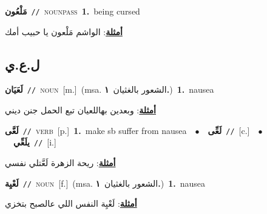 \documentclass[10pt,a4paper,twoside]{article} %
\begin{document}
\begin{multicols}{2}
{\setlength\topsep{0pt}\textbf{\foreignlanguage{arabic}{مَلْعُون}}\ {\color{gray}\texttt{//}\color{black}}\ \textsc{noun\textunderscore pass}\ \textbf{1.}~being cursed\  \begin{flushright}\color{gray}\foreignlanguage{arabic}{\textbf{\underline{\foreignlanguage{arabic}{أمثلة}}}: الواشم مَلْعون يا حبيب أمك}\end{flushright}\color{black}} \vspace{2mm}

\vspace{-3mm}
\subsection*{\color{blue}\foreignlanguage{arabic}{ل.ع.ي}\color{blue}{}} 

{\setlength\topsep{0pt}\textbf{\foreignlanguage{arabic}{لَعَيَان}}\ {\color{gray}\texttt{//}\color{black}}\ \textsc{noun}\ [m.]\ \color{gray}(msa. \foreignlanguage{arabic}{الشعور بالغثيان}~\foreignlanguage{arabic}{\textbf{١.}})\color{black}\ \textbf{1.}~nausea\  \begin{flushright}\color{gray}\foreignlanguage{arabic}{\textbf{\underline{\foreignlanguage{arabic}{أمثلة}}}: وبعدين بهاللعيان تبع الحمل جنن ديني}\end{flushright}\color{black}} \vspace{2mm}

{\setlength\topsep{0pt}\textbf{\foreignlanguage{arabic}{لَعَّى}}\ {\color{gray}\texttt{//}\color{black}}\ \textsc{verb}\ [p.]\ \textbf{1.}~make sb suffer from nausea\ \ $\bullet$\ \ \setlength\topsep{0pt}\textbf{\foreignlanguage{arabic}{لَعِّى}}\ {\color{gray}\texttt{//}\color{black}}\ [c.]\ \ $\bullet$\ \ \setlength\topsep{0pt}\textbf{\foreignlanguage{arabic}{يلَعِّي}}\ {\color{gray}\texttt{//}\color{black}}\ [i.]\  \begin{flushright}\color{gray}\foreignlanguage{arabic}{\textbf{\underline{\foreignlanguage{arabic}{أمثلة}}}: ريحة الزهرة لَعَّتلي نفسي}\end{flushright}\color{black}} \vspace{2mm}

{\setlength\topsep{0pt}\textbf{\foreignlanguage{arabic}{لَعْيِة}}\ {\color{gray}\texttt{//}\color{black}}\ \textsc{noun}\ [f.]\ \color{gray}(msa. \foreignlanguage{arabic}{الشعور بالغثيان}~\foreignlanguage{arabic}{\textbf{١.}})\color{black}\ \textbf{1.}~nausea\  \begin{flushright}\color{gray}\foreignlanguage{arabic}{\textbf{\underline{\foreignlanguage{arabic}{أمثلة}}}: لَعْيِة النفس اللي عالصبح بتخزي}\end{flushright}\color{black}} \vspace{2mm}


\end{multicols}
\end{document}
